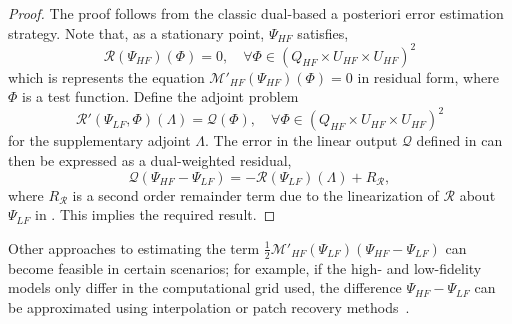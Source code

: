 \documentclass[review,sort&compress]{elsarticle}
\newcommand{\red}[1]{{\color{red}{#1}}}
\begin{document}
%
\begin{proof}
%
The proof follows from the classic dual-based a posteriori error estimation strategy. Note that, as a stationary point, $\Psi_{HF}$ satisfies,
%
\begin{equation}
\mathscr{R}(\Psi_{HF})(\Phi)=0,\quad\forall\Phi\in(Q_{HF}\times U_{HF}\times U_{HF})^2
\label{eq:supadjsys}
\end{equation}
%
which is represents the equation $\mathcal{M}'_{HF}(\Psi_{HF})(\Phi)=0$ in residual form, where $\Phi$ is a test function. Define the adjoint problem
%
\begin{equation}
\mathscr{R}'(\Psi_{LF},\Phi)(\Lambda)=\mathcal{Q}(\Phi),\quad\forall\Phi\in(Q_{HF}\times U_{HF}\times U_{HF})^2
\label{eq:superAdjEq}
\end{equation}
%
for the supplementary adjoint $\Lambda$. The error in the linear output $\mathcal{Q}$ defined in  can then be expressed as a dual-weighted residual,
%
\begin{equation}
\label{eq:adjOutErr}
\mathcal{Q}(\Psi_{HF}-\Psi_{LF})=-\mathscr{R}(\Psi_{LF})(\Lambda) + R_{\mathscr{R}},
\end{equation}
%
where $R_{\mathscr{R}}$ is a second order remainder term due to the linearization of $\mathscr{R}$ about $\Psi_{LF}$ in . This implies the required result. %
%
\end{proof}
%

Other approaches to estimating the term $\frac{1}{2}\mathcal{M}'_{HF}(\Psi_{LF})(\Psi_{HF}-\Psi_{LF})$ can become feasible in certain scenarios; for example, if the high- and low-fidelity models only differ in the computational grid used, the difference $\Psi_{HF}-\Psi_{LF}$ can be approximated using interpolation or patch recovery methods~\cite{BecVex05}.
\end{document}
